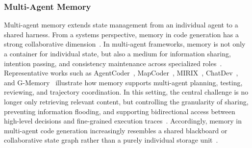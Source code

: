 \documentclass{llmxive}
\begin{document}
\subsubsection{Multi-Agent Memory}
Multi-agent memory extends state management from an individual agent to a shared harness. From a systems perspective, memory in code generation has a strong collaborative dimension~\cite{li2025swe,chen2023gamegpt}. In multi-agent frameworks, memory is not only a container for individual state, but also a medium for information sharing, intention passing, and consistency maintenance across specialized roles~\cite{zhang2025gmemory}. Representative works such as AgentCoder~\cite{huang2023agentcoder}, MapCoder~\cite{islam2024mapcoder}, MIRIX~\cite{wang2025mirix}, ChatDev~\cite{qian2024chatdev}, and G-Memory~\cite{zhang2025gmemory} illustrate how memory supports multi-agent planning, testing, reviewing, and trajectory coordination.
In this setting, the central challenge is no longer only retrieving relevant content, but controlling the granularity of sharing, preventing information flooding, and supporting bidirectional access between high-level decisions and fine-grained execution traces~\cite{chen2023gamegpt}. Accordingly, memory in multi-agent code generation increasingly resembles a shared blackboard or collaborative state graph rather than a purely individual storage unit~\cite{Ishibashi2024SelfOrganized,yuan2025graphs}.
\end{document}
